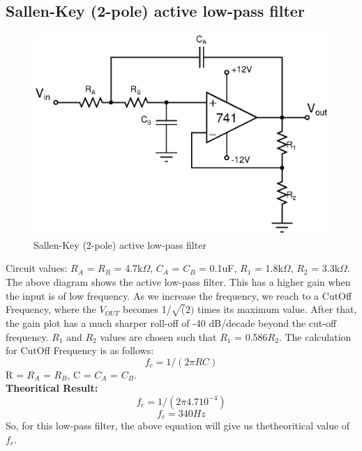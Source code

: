 \documentclass[12pt]{article}
\begin{document}
\subsection{ Sallen-Key (2-pole) active low-pass filter}
\begin{figure}[H]
\begin{center}
\includegraphics[scale = 0.8]{p1.eps}
\caption{ Sallen-Key (2-pole) active low-pass filter}
\end{center}
\end{figure}
Circuit values: $R_A$ = $R_B$ = 4.7k$\Omega $, $C_A$ = $C_B$ = 0.1uF, $R_1$ = 1.8k$\Omega $, $R_2$ = 3.3k$\Omega $. \\
The above diagram shows the active low-pass filter. This has a higher gain when the input is of low frequency. As we increase the frequency, we reach to a CutOff Frequency, where the $V_{OUT}$ becomes 1/$\sqrt(2) $ times its maximum value. After that, the gain plot has a much sharper roll-off of -40 dB/decade beyond the cut-off frequency. $R_1$ and $R_2$ values are chosen such that $R_1$ = 0.586$R_2$. The calculation for CutOff Frequency is as follows:
\begin{equation}
   f_c = 1/(2\pi RC)
 \end{equation}
R = $R_A$ = $R_B$, C =  $C_A$ =  $C_B$.\\
\textbf{Theoritical Result:} \\
\begin{equation}
    f_c = 1/(2\pi 4.7 10^{-4})
 \end{equation}
\begin{equation}
    f_c = 340Hz
 \end{equation}
So, for this low-pass filter, the above equation will give us thetheoritical value of $f_c$.
\end{document}
